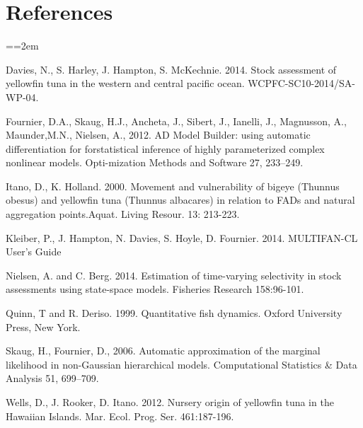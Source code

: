 \documentclass[12pt,letterpaper]{article}
\newcommand\doublespacing{\baselineskip=1.6\normalbaselineskip}
\begin{document}
\section*{References}
{\parindent=0cm \small
\everypar={\hangindent=2em }\par
\doublespacing

Davies, N., S. Harley, J. Hampton, S. McKechnie. 2014. Stock
assessment of yellowfin tuna in the western and central pacific ocean.
WCPFC-SC10-2014/SA-WP-04.

Fournier, D.A., Skaug, H.J., Ancheta, J., Sibert, J., Ianelli, J.,
Magnusson, A., Maunder,M.N., Nielsen, A., 2012. AD Model Builder:
using automatic differentiation for forstatistical inference of highly
parameterized complex nonlinear models. Opti-mization Methods and
Software 27, 233–249.

Itano, D., K. Holland. 2000.  Movement and vulnerability of bigeye
(Thunnus obesus) and yellowfin tuna (Thunnus albacares) in relation to
FADs and natural aggregation points.Aquat. Living Resour. 13: 213-223.

Kleiber, P., J. Hampton, N. Davies, S. Hoyle, D. Fournier. 2014.
MULTIFAN-CL User’s Guide

Nielsen, A. and C. Berg. 2014. Estimation of time-varying selectivity
in stock assessments using state-space models. Fisheries Research
158:96-101.

Quinn, T and R. Deriso. 1999. Quantitative fish dynamics. Oxford
University Press, New York.

Skaug, H., Fournier, D., 2006. Automatic approximation of the marginal
likelihood in non-Gaussian hierarchical models. Computational
Statistics \& Data Analysis 51, 699–709.

Wells, D., J. Rooker, D. Itano. 2012.  Nursery origin of yellowfin
tuna in the Hawaiian Islands. Mar. Ecol. Prog. Ser. 461:187-196. 
\par}

\end{document}
